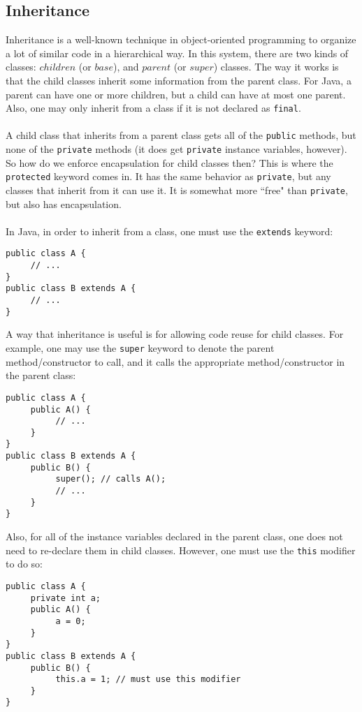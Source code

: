 \subsection{Inheritance}
Inheritance is a well-known technique in object-oriented programming to organize a lot of similar code in a hierarchical way. In this system, there are two kinds of classes: $children$ (or $base$), and $parent$ (or $super$) classes. The way it works is that the child classes inherit some information from the parent class. For Java, a parent can have one or more children, but a child can have at most one parent. Also, one may only inherit from a class if it is not declared as \verb|final|.
\\ \\
A child class that inherits from a parent class gets all of the \verb|public| methods, but none of the \verb|private| methods (it does get \verb|private| instance variables, however). So how do we enforce encapsulation for child classes then? This is where the \verb|protected| keyword comes in. It has the same behavior as \verb|private|, but any classes that inherit from it can use it. It is somewhat more ``free" than \verb|private|, but also has encapsulation.
\\ \\
In Java, in order to inherit from a class, one must use the \verb|extends| keyword:
\begin{lstlisting}
public class A {
     // ...
}
public class B extends A {
     // ...
}
\end{lstlisting}
A way that inheritance is useful is for allowing code reuse for child classes. For example, one may use the \verb|super| keyword to denote the parent method/constructor to call, and it calls the appropriate method/constructor in the parent class:
\begin{lstlisting}
public class A {
     public A() {
          // ...
     }
}
public class B extends A {
     public B() {
          super(); // calls A();
          // ...
     }
}
\end{lstlisting}
Also, for all of the instance variables declared in the parent class, one does not need to re-declare them in child classes. However, one must use the \verb|this| modifier to do so:
\begin{lstlisting}
public class A {
     private int a;
     public A() {
          a = 0;
     }
}
public class B extends A {
     public B() {
          this.a = 1; // must use this modifier
     }
}
\end{lstlisting}

